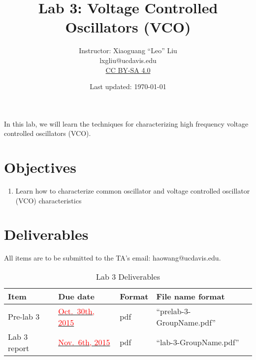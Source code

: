 \documentclass[letterpaper, 11pt]{article}
\newcommand{\due}[1]{\href{https://github.com/ucdart/UCD-EEC134/blob/master/support/schedule/eec134-schedule.pdf}{\textcolor{red}{#1}}}
\begin{document}
\title{Lab 3: Voltage Controlled Oscillators (VCO)}
\author{Instructor: Xiaoguang ``Leo'' Liu\\lxgliu@ucdavis.edu \\
	\small \href{http://creativecommons.org/licenses/by-sa/4.0/}{CC BY-SA 4.0}}
\date{Last updated: \today}

\maketitle

In this lab, we will learn the techniques for characterizing high frequency voltage controlled oscillators (VCO). 

\section{Objectives}

\begin{enumerate}[itemsep=0.1ex]
	\item Learn how to characterize common oscillator and voltage controlled oscillator (VCO) characteristics	
\end{enumerate}



\newpage
\section{Deliverables}
All items are to be submitted to the TA's email: haowang@ucdavis.edu.  

\vspace{0.5cm}

\begin{table}[h]
	\footnotesize
	\caption{Lab 3 Deliverables}
	\renewcommand{\arraystretch}{1.2}
	\begin{tabular}{|m{1in}|l|m{0.45in}|m{2in}|}
		\hline
		\textbf{Item} & \textbf{Due date} & \textbf{Format} & \textbf{File name format} \\
		\hline \hline
		Pre-lab 3 & \due{Oct.~30th, 2015} & pdf & ``prelab-3-GroupName.pdf'' \\
		\hline
		Lab 3 report & \due{Nov.~6th, 2015} & pdf & ``lab-3-GroupName.pdf''\\
		\hline
	\end{tabular}
\end{table}
\end{document}
